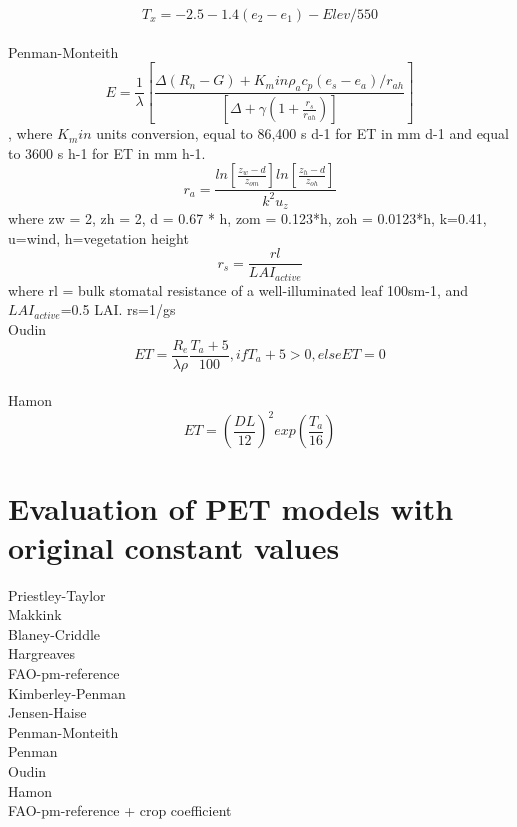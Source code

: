 \documentclass[hydrology,article,submit,moreauthors,pdftex]{Definitions/mdpi}
\begin{document}
\begin{equation}
T_x = -2.5 - 1.4 (e_2-e_1) - Elev/550
\end{equation}
\\
Penman-Monteith \cite{asce2005asce}
\begin{equation}
E = \frac{1}{\lambda} \left[ \frac{\Delta (R_{n}-G)+ K_min \rho_a c_p  (e_{s}-e_{a})/r_{ah}}{\left[ \Delta +\gamma (1+\frac{r_s}{r_{ah}})\right]}\right]
\end{equation}
, where $K_min$ units conversion, equal to 86,400 s d-1 for ET in mm d-1 and equal to 3600 s h-1 for ET in mm h-1.
\begin{equation}
r_a = \frac{ln \left[\frac{z_w-d}{z_{om}}\right]ln \left[\frac{z_h-d}{z_{oh}}\right]}{k^2 u_z}
\end{equation}
where zw = 2, zh = 2, d = 0.67 * h, zom = 0.123*h, zoh = 0.0123*h, k=0.41, u=wind, h=vegetation height
\begin{equation}
r_s = \frac{rl}{LAI_{active}}
\end{equation}
where rl = bulk stomatal resistance of a well-illuminated leaf 100sm-1, and $LAI_{active}$=0.5 LAI. rs=1/gs
\\
Oudin \cite{oudin2005potential}
\begin{equation}
ET = \frac{R_e}{\lambda \rho} \frac{T_a+5}{100}, if T_a + 5 > 0, else ET = 0
\end{equation}
\\
Hamon \cite{oudin2005potential}
\begin{equation}
ET = \left(\frac{DL}{12}\right)^2 exp \left(\frac{T_a}{16}\right)
\end{equation}
\section{Evaluation of PET models with original constant values}
Priestley-Taylor \\
Makkink \\
Blaney-Criddle \\
Hargreaves \\
FAO-pm-reference \\
Kimberley-Penman \\
Jensen-Haise \\
Penman-Monteith \\
Penman \\
Oudin \\
Hamon \\
FAO-pm-reference + crop coefficient \\
\end{document}
